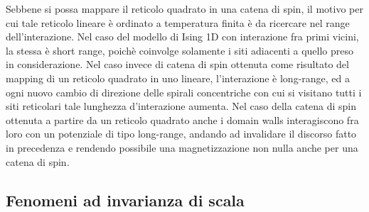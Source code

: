 Sebbene si possa mappare il reticolo quadrato in una catena di spin, il motivo per cui tale reticolo lineare è ordinato a temperatura 
finita è da ricercare nel range dell'interazione. Nel caso del modello di Ising 1D con interazione fra primi vicini, la stessa è short 
range, poichè coinvolge solamente i siti adiacenti a quello preso in considerazione. Nel caso invece di catena di spin ottenuta come 
risultato del mapping di un reticolo quadrato in uno lineare, l'interazione è long-range, ed a ogni nuovo cambio di direzione delle 
spirali concentriche con cui si visitano tutti i siti reticolari tale lunghezza d'interazione aumenta. Nel caso della catena di 
spin ottenuta a partire da un reticolo quadrato anche i domain walls interagiscono fra loro con un potenziale di tipo long-range, andando 
ad invalidare il discorso fatto in precedenza e rendendo possibile una magnetizzazione non nulla anche per una catena di spin. 



\subsection{Fenomeni ad invarianza di scala}



